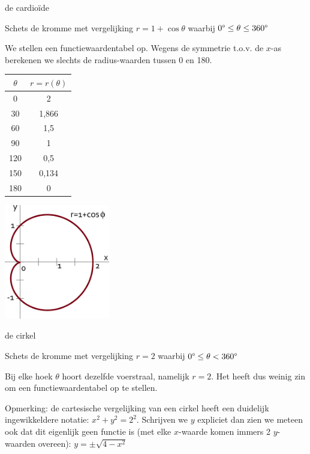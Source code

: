 \begin{voorbeeld}
	de cardio\"ide

Schets de kromme met vergelijking $r=1+\cos\theta$ waarbij $0\text{\textdegree}\leq\theta\leq360\text{\textdegree}$

We stellen een functiewaardentabel op. Wegens de symmetrie t.o.v.
de $x$-as berekenen we slechts de radius-waarden tussen 0\textdegree{}
en 180\textdegree .

\begin{minipage}{0.5\linewidth}
	\centering
\begin{tabular}{c|c}
$\theta$ & $r=r(\theta)$\\
\hline 
0\textdegree{} & 2\\
30\textdegree{} & 1,866\\
60\textdegree{} & 1,5\\
90\textdegree{} & 1\\
120\textdegree{} & 0,5\\
150\textdegree{} & 0,134\\
180\textdegree{} & 0\\
\end{tabular}
\end{minipage}
\begin{minipage}{.48\linewidth}
	\includegraphics[height=5cm]{2_elem_rekenvaardigheden_B/inputs/figuur7.png}
\end{minipage} 

\end{voorbeeld}

\begin{voorbeeld}
	de cirkel

Schets de kromme met vergelijking $r=2$ waarbij $0\text{\textdegree}\leq\theta<360\text{\textdegree}$

Bij elke hoek $\theta$ hoort dezelfde voerstraal, namelijk $r=2$.
Het heeft dus weinig zin om een functiewaardentabel op te stellen.

Opmerking: de cartesische vergelijking van een cirkel heeft een duidelijk
ingewikkeldere notatie: $x^{2}+y^{2}=2^{2}$. Schrijven we $y$ expliciet
dan zien we meteen ook dat dit eigenlijk geen functie is (met elke
$x$-waarde komen immers 2 $y$-waarden overeen): $y=\pm\sqrt{4-x^{2}}$

\end{voorbeeld}